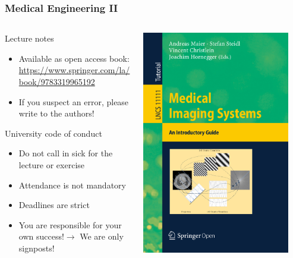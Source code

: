 \begin{frame}
	\frametitle{Medical Engineering II}
	\begin{columns}[c, onlytextwidth]
		\begin{column}{0.6\textwidth}
			\begin{block}{Lecture notes}
				\begin{itemize}
					\item Available as open access book: \url{https://www.springer.com/la/book/9783319965192}
					\item If you suspect an error, please write to the authors!
				\end{itemize}
			\end{block}
			\begin{block}{University code of conduct}
				\begin{itemize}
					\item Do not call in sick for the lecture or exercise
					\item Attendance is not mandatory
					\item Deadlines are strict
					\item You are responsible for your own success!\newline $\rightarrow$ We are only signposts!
				\end{itemize}
			\end{block}
		\end{column}\begin{column}{0.3\textwidth}
			\href{https://www.springer.com/la/book/9783319965192}{\includegraphics[width=0.9\textwidth]{Bilder/book_cover.png}}

\end{column}
\end{columns}
\end{frame}
